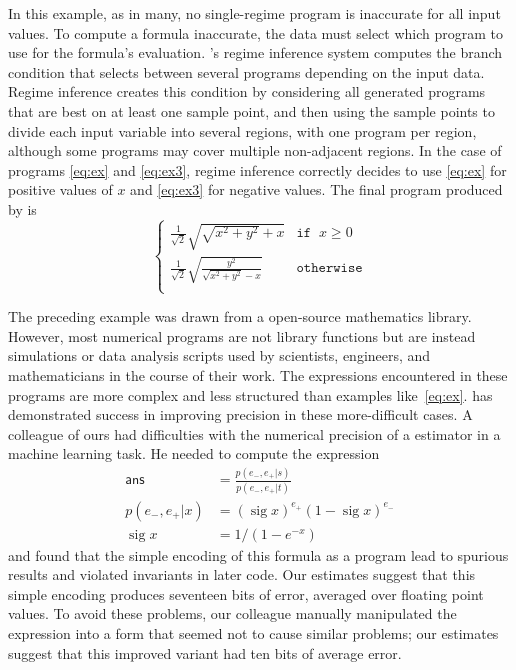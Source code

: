 \documentclass[paper.tex]{subfiles}
\begin{document}
In this example, as in many,
  no single-regime program is inaccurate for all input values.
To compute a formula inaccurate, the data must select
  which program to use for the formula's evaluation.
\casio's regime inference system
  computes the branch condition
  that selects between several programs depending on the input data.
Regime inference creates this condition
  by considering all generated programs
  that are best on at least one sample point,
  and then using the sample points to divide each input variable
  into several regions, with one program per region,
  although some programs may cover multiple non-adjacent regions.
In the case of programs \eqref{eq:ex} and \eqref{eq:ex3},
  regime inference correctly decides
  to use \eqref{eq:ex} for positive values of $x$
  and \eqref{eq:ex3} for negative values.
The final program produced by \casio is
\[
\begin{cases}
  \frac1{\sqrt2} \sqrt{\sqrt{x^2 + y^2} + x} & \mathtt{if} \;\; x \ge 0 \\[8pt]
  \frac1{\sqrt2} \sqrt{\frac{y^2}{\sqrt{x^2 + y^2} - x}} & \mathtt{otherwise} \\
\end{cases}
\]

The preceding example was drawn from a open-source mathematics library.
However, most numerical programs are not library functions
  but are instead simulations or data analysis scripts
  used by scientists, engineers, and mathematicians
  in the course of their work.
The expressions encountered in these programs are more complex
  and less structured than examples like~\eqref{eq:ex}.
\casio has demonstrated success in improving precision
  in these more-difficult cases.
A colleague of ours had difficulties with the numerical precision
  of a estimator in a machine learning task.
He needed to compute the expression
\begin{align*}
\mathsf{ans} &= \frac{p(e_-,e_+|s)}{p(e_-,e_+|t)} \\
p(e_-, e_+|x) &= (\operatorname{sig} x)^{e_+} (1 - \operatorname{sig} x)^{e_-} \\
\operatorname{sig}x &= 1 / (1 - e^{-x})
\end{align*}
  and found that the simple encoding of this formula as a program
  lead to spurious results and violated invariants in later code.
Our estimates suggest that this simple encoding produces
  seventeen bits of error, averaged over floating point values.
To avoid these problems,
  our colleague manually manipulated the expression
  into a form that seemed not to cause similar problems;
  our estimates suggest that this improved variant
  had ten bits of average error.
\end{document}
